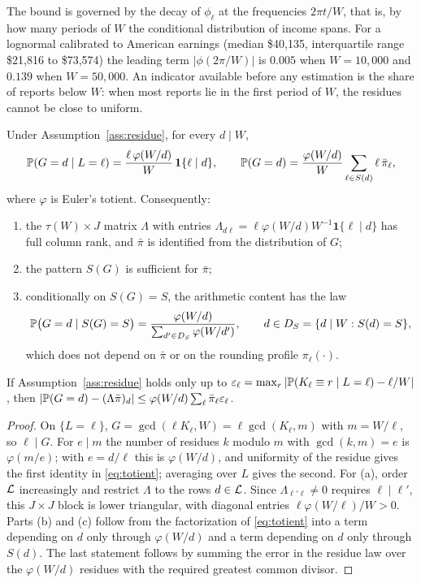 The bound is governed by the decay of $\phi_\ell$ at the frequencies $2\pi t/W$, that is, by how many periods of $W$ the conditional distribution of income spans. For a lognormal calibrated to American earnings (median \$40{,}135, interquartile range \$21{,}816 to \$73{,}574) the leading term $|\phi(2\pi/W)|$ is $0.005$ when $W=10{,}000$ and $0.139$ when $W=50{,}000$. An indicator available before any estimation is the share of reports below $W$: when most reports lie in the first period of $W$, the residues cannot be close to uniform.

\begin{proposition}\label{prop:totient}
Under Assumption~\ref{ass:residue}, for every $d\mid W$,
\begin{equation}\label{eq:totient}
\mathbb{P}(G=d\mid L=\ell)=\frac{\ell\,\varphi(W/d)}{W}\,\mathbf 1\{\ell\mid d\},
\qquad
\mathbb{P}(G=d)=\frac{\varphi(W/d)}{W}\sum_{\ell\in S(d)}\ell\,\bar\pi_\ell ,
\end{equation}
where $\varphi$ is Euler's totient. Consequently:
\begin{enumerate}
\item[(a)] the $\tau(W)\times J$ matrix $\Lambda$ with entries $\Lambda_{d\ell}=\ell\varphi(W/d)W^{-1}\mathbf 1\{\ell\mid d\}$ has full column rank, and $\bar\pi$ is identified from the distribution of $G$;
\item[(b)] the pattern $S(G)$ is sufficient for $\bar\pi$;
\item[(c)] conditionally on $S(G)=S$, the arithmetic content has the law
\begin{equation}\label{eq:withinG}
\mathbb{P}\bigl(G=d\mid S(G)=S\bigr)=\frac{\varphi(W/d)}{\sum_{d'\in D_S}\varphi(W/d')},\qquad d\in D_S=\{d\mid W: S(d)=S\},
\end{equation}
which does not depend on $\bar\pi$ or on the rounding profile $\pi_\ell(\cdot)$.
\end{enumerate}
If Assumption~\ref{ass:residue} holds only up to $\varepsilon_\ell=\max_r|\mathbb{P}(K_\ell\equiv r\mid L=\ell)-\ell/W|$, then $|\mathbb{P}(G=d)-(\Lambda\bar\pi)_d|\le\varphi(W/d)\sum_\ell\bar\pi_\ell\varepsilon_\ell$.
\end{proposition}

\begin{proof}
On $\{L=\ell\}$, $G=\gcd(\ell K_\ell,W)=\ell\gcd(K_\ell,m)$ with $m=W/\ell$, so $\ell\mid G$. For $e\mid m$ the number of residues $k$ modulo $m$ with $\gcd(k,m)=e$ is $\varphi(m/e)$; with $e=d/\ell$ this is $\varphi(W/d)$, and uniformity of the residue gives the first identity in \eqref{eq:totient}; averaging over $L$ gives the second. For (a), order $\mathcal{L}$ increasingly and restrict $\Lambda$ to the rows $d\in\mathcal{L}$. Since $\Lambda_{\ell'\ell}\neq0$ requires $\ell\mid\ell'$, this $J\times J$ block is lower triangular, with diagonal entries $\ell\varphi(W/\ell)/W>0$. Parts (b) and (c) follow from the factorization of \eqref{eq:totient} into a term depending on $d$ only through $\varphi(W/d)$ and a term depending on $d$ only through $S(d)$. The last statement follows by summing the error in the residue law over the $\varphi(W/d)$ residues with the required greatest common divisor.
\end{proof}

